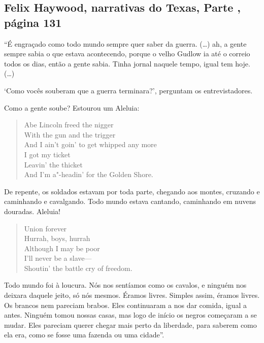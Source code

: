 \subsection{Felix Haywood, narrativas do Texas, Parte , página 131}
\label{ref134}

``É engraçado como todo mundo sempre quer saber da guerra. (\ldots{})
ah, a gente sempre sabia o que estava acontecendo, porque o velho Gudlow
ia até o correio todos os dias, então a gente sabia. Tinha jornal
naquele tempo, igual tem hoje. (\ldots{})

`Como vocês souberam que a guerra terminara?', perguntam os
entrevistadores.

Como a gente soube? Estourou um Aleluia:

\begin{verse}
Abe Lincoln freed the nigger\\
With the gun and the trigger\\
And I ain't goin' to get whipped any more\\
I got my ticket\\
Leavin' the thicket\\
And I'm a"-headin' for the Golden Shore.\footnotemark
\end{verse}


De repente, os soldados estavam por toda parte, chegando aos montes,
cruzando e caminhando e cavalgando. Todo mundo estava cantando,
caminhando em nuvens douradas. Aleluia!

\begin{verse}
Union forever\\
Hurrah, boys, hurrah\\ 
Although I may be poor\\ 
I'll never be a slave---\\ 
Shoutin' the battle cry of freedom.\footnotemark
\end{verse}


Todo mundo foi à loucura. Nós nos sentíamos como os cavalos, e ninguém
nos deixara daquele jeito, só nós mesmos. Éramos livres. Simples assim,
éramos livres. Os brancos nem pareciam brabos. Eles continuaram a nos
dar comida, igual a antes. Ninguém tomou nossas casas, mas logo de
início os negros começaram a se mudar. Eles pareciam querer chegar mais
perto da liberdade, para saberem como ela era, como se fosse uma fazenda
ou uma cidade''.

